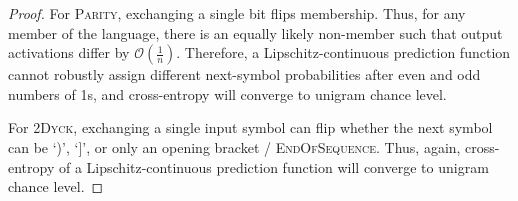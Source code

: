 \documentclass[11pt,a4paper]{article}
\begin{document}
\begin{proof}
For \textsc{Parity}, exchanging a single bit flips membership.
Thus, for any member of the language, there is an equally likely non-member such that output activations differ by $\mathcal{O}(\frac{1}{n})$.
Therefore, a Lipschitz-continuous prediction function cannot robustly assign different next-symbol probabilities after even and odd numbers of 1s, and cross-entropy will converge to unigram chance level.

For \textsc{2Dyck}, exchanging a single input symbol can flip whether the next symbol can be `)', `]', or only an opening bracket / \textsc{EndOfSequence}.
Thus, again, cross-entropy of a Lipschitz-continuous prediction function will converge to unigram chance level.
\end{proof}
\end{document}
